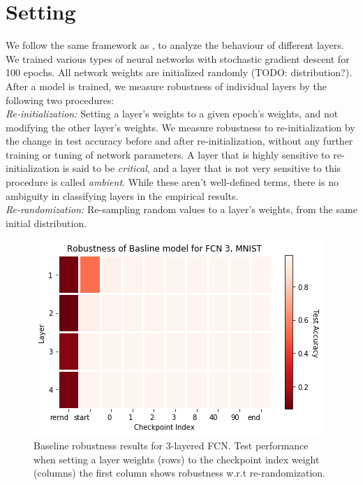 \documentclass{article}
\begin{document}
\section{Setting} \label{setting}
We follow the same framework as \cite{allLayers}, to analyze the behaviour of different layers. We trained various types of neural networks with stochastic gradient descent for 100 epochs. All network weights are initialized randomly (TODO: distribution?). After a model is trained, we measure robustness of individual layers by the following two procedures:\\
\emph{Re-initialization:} Setting a layer's weights to a given epoch's weights, and not modifying the other layer's weights. We measure robustness to re-initialization by the change in test accuracy before and after re-initialization, without any further training or tuning of network parameters. A layer that is highly sensitive to re-initialization is said to be \emph{critical}, and a layer that is not very sensitive to this procedure is called \emph{ambient}. While these aren't well-defined terms, there is no ambiguity in classifying layers in the empirical results. \\
\emph{Re-randomization:} Re-sampling random values to a layer's weights, from the same initial distribution. \\
\begin{figure}
  \includegraphics[width=\linewidth]{images/baseline_fc3_mnist_heatmap.png}
  \caption{Baseline robustness results for 3-layered FCN. Test performance when setting a layer weights (rows) to the checkpoint index weight (columns) the first column shows robustness w.r.t re-randomization.}
  \label{fig:baseline_fc3_heatmap}
\end{figure}
\end{document}
